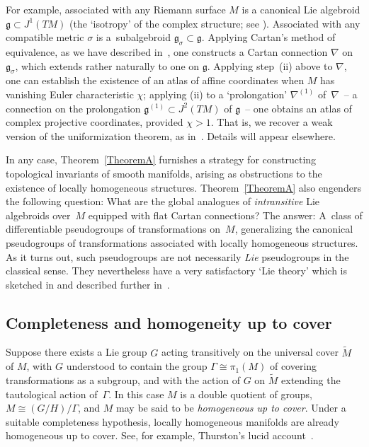 \documentclass[pdftex]{sigma}
\numberwithin{equation}{section}
\begin{document}
For example, associated with any Riemann surface $M$ is a canonical
Lie algebroid ${\mathfrak g} \subset J^1 ({TM})$ (the `isotropy' of
the complex structure; see \cite{Blaom_12}). Associated with any
compatible metric $\sigma$ is a~subalgebroid ${\mathfrak g}_\sigma
\subset {\mathfrak g}$. Applying Cartan's method of equivalence, as we
have described in~\cite{Blaom_12}, one constructs a Cartan connection
$\nabla$ on ${\mathfrak g}_\sigma$, which extends rather naturally to
one on ${\mathfrak g}$.  Applying step~(ii) above to $\nabla$, one can
establish the existence of an atlas of af\/f\/ine coordinates when $M$ has
vanishing Euler characteristic $\chi$; applying (ii) to a
`prolongation' $\nabla^{(1)}$ of~$\nabla $~-- a connection on the
prolongation ${\mathfrak g}^{(1)} \subset J^2({TM})$ of ${\mathfrak
  g}$~-- one obtains an atlas of complex projective coordinates,
provided $\chi > 1$. That is, we recover a weak version of the
uniformization theorem, as in~\cite{Gunning_67}. Details will appear
elsewhere.

In any case, Theorem~\ref{TheoremA} furnishes a strategy for constructing
topological invariants of smooth manifolds, arising as obstructions to
the existence of locally homogeneous structures. Theorem~\ref{TheoremA} also
engenders the following question: What are the global analogues of
{\em intransitive} Lie algebroids over~$M$ equipped with f\/lat Cartan
connections? The answer: A~class of dif\/ferentiable pseudogroups of
transformations on~$M$, generalizing the canonical pseudogroups of
transformations associated with locally homogeneous structures. As it
turns out, such pseudogroups are not necessarily {\em Lie}
pseudogroups in the classical sense. They nevertheless have a very
satisfactory `Lie theory' which is sketched in \cite[Appendix~A]{Blaom_12} and described further in~\cite{Blaom_C}.

\subsection{Completeness and homogeneity up to cover}\label{coco}

Suppose there exists a Lie group $G$ acting transitively on the
universal cover $\tilde M$ of $M$, with $G$ understood to contain the
group $\Gamma\cong \pi_1(M)$ of covering transformations as a
subgroup, and with the action of $G$ on $\tilde M$ extending the
tautological action of~$\Gamma$. In this case $M$ is a double quotient
of groups, $M\cong (G/H)/\Gamma$, and $M$ may be said to be {\it
  homogeneous up to cover}. Under a suitable completeness hypothesis,
locally homogeneous manifolds are already homogeneous up to
cover. See, for example, Thurston's lucid account~\cite{Thurston_97}.
\end{document}
